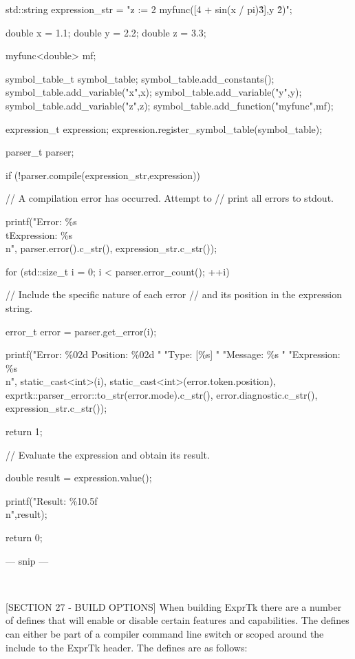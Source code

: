 {{	std::string expression\_str =
	"z := 2 myfunc([4 + sin(x / pi)\^3],y \^ 2)";
	
	double x = 1.1;
	double y = 2.2;
	double z = 3.3;
	
	myfunc<double> mf;
	
	symbol\_table\_t symbol\_table;
	symbol\_table.add\_constants();
	symbol\_table.add\_variable("x",x);
	symbol\_table.add\_variable("y",y);
	symbol\_table.add\_variable("z",z);
	symbol\_table.add\_function("myfunc",mf);
	
	expression\_t expression;
	expression.register\_symbol\_table(symbol\_table);
	
	parser\_t parser;
	
	if (!parser.compile(expression\_str,expression))
	{
		// A compilation error has occurred. Attempt to
		// print all errors to stdout.
		
		printf("Error: \%s\\tExpression: \%s\\n",
		parser.error().c\_str(),
		expression\_str.c\_str());
		
		for (std::size\_t i = 0; i < parser.error\_count(); ++i)
		{
			// Include the specific nature of each error
			// and its position in the expression string.
			
			error\_t error = parser.get\_error(i);
			
			printf("Error: \%02d Position: \%02d "
			"Type: [\%s] "
			"Message: \%s "
			"Expression: \%s\\n",
			static\_cast<int>(i),
			static\_cast<int>(error.token.position),
			exprtk::parser\_error::to\_str(error.mode).c\_str(),
			error.diagnostic.c\_str(),
			expression\_str.c\_str());
		}
		
		return 1;
	}
	
	// Evaluate the expression and obtain its result.
	
	double result = expression.value();
	
	printf("Result: \%10.5f\\n",result);
	
	return 0;
}
--- snip ---

~~~~~~~~~~~~~~~~~~~~~~~~~~~~~~~~~~~~~~~~~~~~~~~~~~~~~~~~~~

[SECTION 27 - BUILD OPTIONS]
When building ExprTk there are a number of defines that will enable or
disable certain features and  capabilities. The defines can  either be
part of a compiler command line switch or scoped around the include to
the ExprTk header. The defines are as follows:

}
